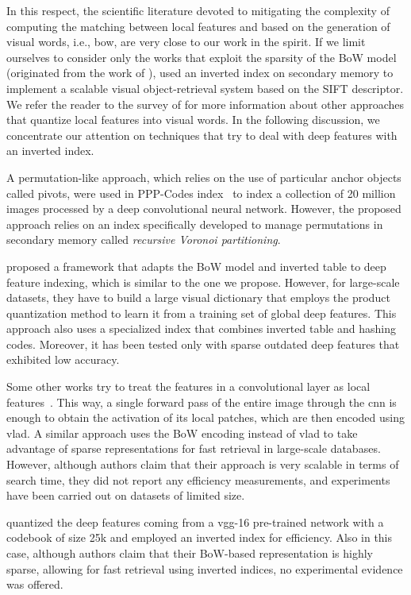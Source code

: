 In this respect, the scientific literature devoted to mitigating the complexity of computing the matching between local features and based on the generation of visual words, i.e., \acrfull{bow}, are very close to our work in the spirit.
If we limit ourselves to consider only the works that exploit the sparsity of the BoW model (originated from the work of \citet{sivic2003video}), \citet{philbin2007object} used an inverted index on secondary memory to implement a scalable visual object-retrieval system based on the SIFT descriptor.
We refer the reader to the survey of \citet{zheng2018sift} for more information about other approaches that quantize local features into visual words.
In the following discussion, we concentrate our attention on techniques that try to deal with deep features with an inverted index.

A permutation-like approach, which relies on the use of particular anchor objects called pivots, were used in PPP-Codes index~\cite{novak2015large} to index a collection of 20 million images processed by a deep convolutional neural network.
However, the proposed approach relies on an index specifically developed to manage permutations in secondary memory called \emph{recursive Voronoi partitioning}.

\citet{liu2015indexing} proposed a framework that adapts the BoW model and inverted table to deep feature indexing, which is similar to the one we propose.
However, for large-scale datasets, they have to build a large visual dictionary that employs the product quantization method to learn it from a training set of global deep features.
This approach also uses a specialized index that combines inverted table and hashing codes.
Moreover, it has been tested only with sparse outdated deep features that exhibited low accuracy.

Some other works try to treat the features in a convolutional layer as local features~\cite{arandjelovic2015netvlad,yue2015exploiting}.
This way, a single forward pass of the entire image through the \gls{cnn} is enough to obtain the activation of its local patches, which are then encoded using \acrfull{vlad}.
A similar approach uses the BoW encoding instead of \gls{vlad} to take advantage of sparse representations for fast retrieval in large-scale databases.
However, although authors claim that their approach is very scalable in terms of search time, they did not report any efficiency measurements, and experiments have been carried out on datasets of limited size.

\citet{mohedano2016bags} quantized the deep features coming from a \gls{vgg}-16 pre-trained network with a codebook of size 25k and employed an inverted index for efficiency.
Also in this case, although authors claim that their BoW-based representation is highly sparse, allowing for fast retrieval using inverted indices, no experimental evidence was offered.


